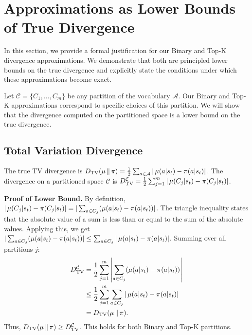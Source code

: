 \section{Approximations as Lower Bounds of True Divergence}  
\label{app:divergence_lower_bounds}  
  
In this section, we provide a formal justification for our Binary and Top-K divergence approximations. We demonstrate that both are principled lower bounds on the true divergence and explicitly state the conditions under which these approximations become exact.  
  
Let $\mathcal{C} = \{C_1, \dots, C_m\}$ be any partition of the vocabulary $\mathcal{A}$. Our Binary and Top-K approximations correspond to specific choices of this partition. We will show that the divergence computed on the partitioned space is a lower bound on the true divergence.  
  
\subsection{Total Variation Divergence}  
  
The true TV divergence is $D_{\mathrm{TV}}(\operatorname*{{\textcolor{black}{\mu}}} \|  \operatorname*{{\textcolor{black}{\pi}}}) = \frac{1}{2} \sum_{a \in \mathcal{A}} |\operatorname*{{\textcolor{black}{\mu}}}(a|s_t) - \operatorname*{{\textcolor{black}{\pi}}}(a|s_t)|$. The divergence on a partitioned space $\mathcal{C}$ is $D_{\mathrm{TV}}^{\mathcal{C}} = \frac{1}{2} \sum_{j=1}^m |\operatorname*{{\textcolor{black}{\mu}}}(C_j|s_t) - \operatorname*{{\textcolor{black}{\pi}}}(C_j|s_t)|$.  
  
\textbf{Proof of Lower Bound.}  
By definition, $|\operatorname*{{\textcolor{black}{\mu}}}(C_j|s_t) - \operatorname*{{\textcolor{black}{\pi}}}(C_j|s_t)| = |\sum_{a \in C_j} (\operatorname*{{\textcolor{black}{\mu}}}(a|s_t) - \operatorname*{{\textcolor{black}{\pi}}}(a|s_t))|$. The triangle inequality states that the absolute value of a sum is less than or equal to the sum of the absolute values. Applying this, we get $|\sum_{a \in C_j} (\operatorname*{{\textcolor{black}{\mu}}}(a|s_t) - \operatorname*{{\textcolor{black}{\pi}}}(a|s_t))| \le \sum_{a \in C_j} |\operatorname*{{\textcolor{black}{\mu}}}(a|s_t) - \operatorname*{{\textcolor{black}{\pi}}}(a|s_t)|$. Summing over all partitions $j$:  
\begin{align*}  
D_{\mathrm{TV}}^{\mathcal{C}} &= \frac{1}{2} \sum_{j=1}^m \left| \sum_{a \in C_j} (\operatorname*{{\textcolor{black}{\mu}}}(a|s_t) - \operatorname*{{\textcolor{black}{\pi}}}(a|s_t)) \right| \\  
&\le \frac{1}{2} \sum_{j=1}^m \sum_{a \in C_j} |\operatorname*{{\textcolor{black}{\mu}}}(a|s_t) - \operatorname*{{\textcolor{black}{\pi}}}(a|s_t)| \\
&= D_{\mathrm{TV}}(\operatorname*{{\textcolor{black}{\mu}}} \|  \operatorname*{{\textcolor{black}{\pi}}}).  
\end{align*}  
Thus, $D_{\mathrm{TV}}(\operatorname*{{\textcolor{black}{\mu}}} \|  \operatorname*{{\textcolor{black}{\pi}}}) \ge D_{\mathrm{TV}}^{\mathcal{C}}$. This holds for both Binary and Top-K partitions.  
  
